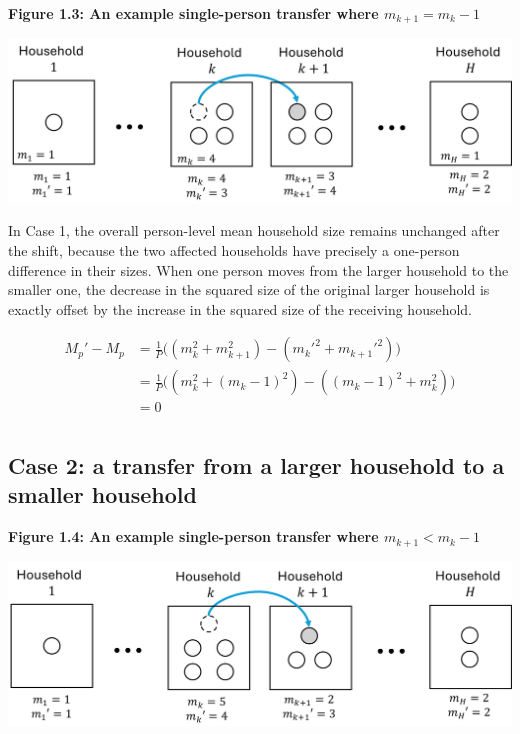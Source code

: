\documentclass[
]{article}
\begin{document}
\textbf{Figure 1.3: An example single-person transfer where
\(m_{k+1} = m_k - 1\)}

\includegraphics[width=1\linewidth]{proof_files/figure1-3}

In Case 1, the overall person-level mean household size remains
unchanged after the shift, because the two affected households have
precisely a one-person difference in their sizes. When one person moves
from the larger household to the smaller one, the decrease in the
squared size of the original larger household is exactly offset by the
increase in the squared size of the receiving household.

\begin{align}
M_p' - M_p & = \frac{1}{P} \bigg( (m_k^2 + m_{k+1}^2) - (m_k'^2 + m_{k+1}'^2) \bigg) \\
& = \frac{1}{P} \bigg( (m_k^2 + (m_k - 1)^2) - ((m_k-1)^2 + m_k^2) \bigg)\\
& = 0 \\
\end{align}

\hypertarget{case-2-a-transfer-from-a-larger-household-to-a-smaller-household}{%
\subsection{Case 2: a transfer from a larger household to a smaller
household}\label{case-2-a-transfer-from-a-larger-household-to-a-smaller-household}}

\textbf{Figure 1.4: An example single-person transfer where
\(m_{k+1} < m_k - 1\)}

\includegraphics[width=1\linewidth]{proof_files/figure1-4}
\end{document}
